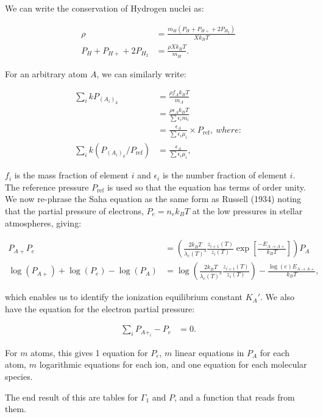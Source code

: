 \documentclass[12pt]{article}
\begin{document}
We can write the conservation of Hydrogen nuclei as:

\begin{align}
\rho &= \frac{m_H(P_H + P_{H+} + 2P_{H_2})}{X k_B T}\\
P_H + P_{H+} + 2P_{H_2} &= \frac{\rho X k_B T}{m_H}.
\end{align}

For an arbitrary atom $A$, we can similarly write:

\begin{align}
\sum_i k P_{(A_i)_k} &= \frac{\rho f_A k_B T}{m_A}\\
&= \frac{\rho \epsilon_A k_B T}{\sum \epsilon_i m_i} \\
&= \frac{\epsilon_A }{\sum \epsilon_i \mu_i} \times P_\text{ref},{~where}:\\
\sum_i k (P_{(A_i)_k} / P_\text{ref} ) &=  \frac{\epsilon_A }{\sum \epsilon_i \mu_i} ,
\end{align}

$f_i$ is the mass fraction of element $i$ and $\epsilon_i$ is the number fraction of element $i$. The reference pressure $P_\text{ref}$ is used so that the equation has terms of order unity. We now re-phrase the Saha equation as the same form as Russell (1934) noting that the partial pressure of electrons, $P_e = n_e k_B T$ at the low pressures in stellar atmospheres, giving:

\begin{align}
P_{A+}P_e &= \left( \frac{2 k_B T}{\lambda_e(T)^3} \frac{z_{i+1}(T)}{z_i(T)} \exp \left[  \frac{-E_{A \rightarrow A+}}{k_B T} \right] \right) P_A \\
\log(P_{A+}) + \log(P_e) - \log(P_A) &= \log\left( \frac{2 k_B T}{\lambda_e(T)^3} \frac{z_{i+1}(T)}{z_i(T)} \right) - \frac{\log(e) E_{A \rightarrow A+}}{k_B T} ,
\end{align}

which enables us to identify the ionization equilibrium constant $K_A'$. We also have the equation for the electron partial pressure:

\begin{align}
\sum_i P_{A+_i}  - P_e &= 0.
\end{align}

For $m$ atoms, this gives 1 equation for $P_e$, $m$ linear equations in $P_A$ for each atom, $m$ logarithmic equations for each ion, and one equation for each molecular species. 

The end result of this are tables for $\Gamma_1$ and $P$, and a function that reads from them.
\end{document}

